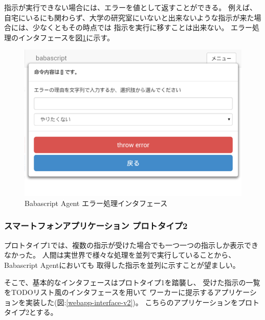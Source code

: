 指示が実行できない場合には、エラーを値として返すことができる。
例えば、自宅にいるにも関わらず、大学の研究室にいないと出来ないような指示が来た場合には、少なくともその時点では
指示を実行に移すことは出来ない。
エラー処理のインタフェースを図\ref{fig:throw-error}に示す。

\begin{figure}[htbp]
  \begin{center}
  \includegraphics[width=.5\linewidth,bb=0 0 768 518]{images/throw-error.png}
  \end{center}
  \caption{Babascript Agent エラー処理インタフェース}
  \label{fig:throw-error}
\end{figure}

\subsubsection{スマートフォンアプリケーション
プロトタイプ2}\label{ux30b9ux30deux30fcux30c8ux30d5ux30a9ux30f3ux30a2ux30d7ux30eaux30b1ux30fcux30b7ux30e7ux30f3-ux30d7ux30edux30c8ux30bfux30a4ux30d72}

プロトタイプ1では、複数の指示が受けた場合でも一つ一つの指示しか表示できなかった。
人間は実世界で様々な処理を並列で実行していることから、Babascript
Agentにおいても 取得した指示を並列に示すことが望ましい。

そこで、基本的なインタフェースはプロトタイプ1を踏襲し、
受けた指示の一覧をTODOリスト風のインタフェースを用いて
ワーカーに提示するアプリケーションを実装した(図:\ref{webapp-interface-v2})。
こちらのアプリケーションをプロトタイプ2とする。


